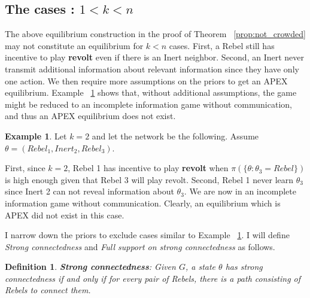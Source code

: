 \documentclass[12pt,letterpaper]{article}
\newtheorem{definition}{Definition}[section]
\theoremstyle{definition}
\newtheorem{example}{Example}[section]
\theoremstyle{remark}
\theoremstyle{claim}
\begin{document}
\subsection{The cases : $1<k<n$}

The above equilibrium construction in the proof of Theorem ~\ref{prop:not_crowded} may not constitute an equilibrium for $k<n$ cases. First, a Rebel still has incentive to play \textbf{revolt} even if there is an Inert neighbor. Second, an Inert never transmit additional information about relevant information since they have only one action. We then require more assumptions on the priors to get an APEX equilibrium. Example ~\ref{ex_strong_connectedness} shows that, without additional assumptions, the game might be reduced to an incomplete information game without communication, and thus an APEX equilibrium does not exist.

\begin{example}\label{ex_strong_connectedness}
Let $k=2$ and let the network be the following. Assume $\theta=(Rebel_1,Inert_2,Rebel_3)$.

\begin{center}
\end{center}

First, since $k=2$, Rebel 1 has incentive to play \textbf{revolt} when $\pi(\{\theta:\theta_3=Rebel\})$ is high enough given that Rebel 3 will play revolt. Second, Rebel 1 never learn $\theta_3$ since Inert 2 can not reveal information about $\theta_3$. We are now in an incomplete information game without communication. Clearly, an equilibrium which is APEX did not exist in this case.

\end{example}

I narrow down the priors to exclude cases similar  to Example ~\ref{ex_strong_connectedness}. I will define \textit{Strong connectedness} and \textit{Full support on strong connectedness} as follows.

\begin{definition}
\textbf{Strong connectedness}: Given $G$, a state $\theta$ has strong connectedness if and only if for every pair of Rebels, there is a path consisting of Rebels to connect them.
\end{definition}  
\end{document}
